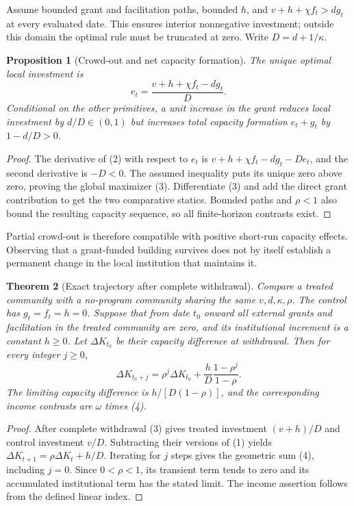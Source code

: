 \documentclass[11pt]{article}
\newtheorem{theorem}{Theorem}
\newtheorem{proposition}[theorem]{Proposition}
\theoremstyle{definition}
\begin{document}
Assume bounded grant and facilitation paths, bounded $h$, and
$v+h+\chi f_t>dg_t$ at every evaluated date. This ensures interior nonnegative investment; outside this domain the optimal rule must be truncated at zero. Write $D=d+1/\kappa$.

\begin{proposition}[Crowd-out and net capacity formation]
The unique optimal local investment is
\[
 e_t=\frac{v+h+\chi f_t-dg_t}{D}.
 \tag{3}
\]
Conditional on the other primitives, a unit increase in the grant reduces local investment by $d/D\in(0,1)$ but increases total capacity formation $e_t+g_t$ by $1-d/D>0$.
\end{proposition}
\begin{proof}
The derivative of (2) with respect to $e_t$ is $v+h+\chi f_t-dg_t-De_t$, and the second derivative is $-D<0$. The assumed inequality puts its unique zero above zero, proving the global maximizer (3). Differentiate (3) and add the direct grant contribution to get the two comparative statics. Bounded paths and $\rho<1$ also bound the resulting capacity sequence, so all finite-horizon contrasts exist.
\end{proof}

Partial crowd-out is therefore compatible with positive short-run capacity effects. Observing that a grant-funded building survives does not by itself establish a permanent change in the local institution that maintains it.

\begin{theorem}[Exact trajectory after complete withdrawal]
Compare a treated community with a no-program community sharing the same $v,d,\kappa,\rho$. The control has $g_t=f_t=h=0$. Suppose that from date $t_0$ onward all external grants and facilitation in the treated community are zero, and its institutional increment is a constant $h\geq0$. Let $\Delta K_{t_0}$ be their capacity difference at withdrawal. Then for every integer $j\geq0$,
\[
 \Delta K_{t_0+j}
 =\rho^j\Delta K_{t_0}
    +\frac{h}{D}\frac{1-\rho^j}{1-\rho}.
 \tag{4}
\]
The limiting capacity difference is $h/[D(1-\rho)]$, and the corresponding income contrasts are $\omega$ times (4).
\end{theorem}
\begin{proof}
After complete withdrawal (3) gives treated investment $(v+h)/D$ and control investment $v/D$. Subtracting their versions of (1) yields
$\Delta K_{t+1}=\rho\Delta K_t+h/D$.
Iterating for $j$ steps gives the geometric sum (4), including $j=0$. Since $0<\rho<1$, its transient term tends to zero and its accumulated institutional term has the stated limit. The income assertion follows from the defined linear index.
\end{proof}
\end{document}
